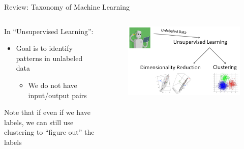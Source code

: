\documentclass[aspectratio=169]{../latex_main/tntbeamer}  %
\begin{document}
	
	
	\begin{frame}{Review: Taxonomy of Machine Learning}
	    \begin{columns}
	    

	        \begin{column}{.5\textwidth}
	               In “Unsupervised Learning”:
	               \begin{itemize}
	                   \item Goal is to identify patterns in unlabeled data
	                   \begin{itemize}
	                       \item We do not have input/output pairs
	                   \end{itemize}
	               \end{itemize}
	               Note that if even if we have labels, we can still use clustering to “figure out” the labels
	        \end{column}
	        
	        
	        \begin{column}{.5\textwidth}
	                 \begin{figure}
	                    \centering
	                    \includegraphics[scale=.33]{Bild3}
	                \end{figure}
	        \end{column}
	    \end{columns}
	\end{frame}
	
	
	
\end{document}
